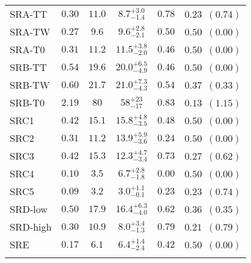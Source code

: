{\begin{tabular*}{\textwidth}{@{\extracolsep{\fill}}lccccc}
SRA-TT    & $0.30$ &  $11.0$ & $ { 8.7 }^{ +3.0 }_{ -1.4 }$ & $0.78$ & $ 0.23$~$(0.74)$ \\%
SRA-TW    & $0.27$ &  $9.6$ & $ { 9.6 }^{ +2.8 }_{ -2.1 }$ & $0.50$ & $ 0.50$~$(0.00)$ \\%
SRA-T0    & $0.31$ &  $11.2$ & $ { 11.5 }^{ +3.8 }_{ -2.0 }$ & $0.46$ & $ 0.50$~$(0.00)$ \\%
SRB-TT    & $0.54$ &  $19.6$ & $ { 20.0 }^{ +6.5 }_{ -4.9 }$ & $0.46$ & $ 0.50$~$(0.00)$ \\%
SRB-TW    & $0.60$ &  $21.7$ & $ { 21.0 }^{ +7.3 }_{ -4.3 }$ & $0.54$ & $ 0.37$~$(0.33)$ \\%
SRB-T0    & $2.19$ &  $80$ & $ { 58 }^{ +23 }_{ -17 }$ & $0.83$ & $ 0.13$~$(1.15)$ \\%
SRC1    & $0.42$ &  $15.1$ & $ { 15.8 }^{ +4.8 }_{ -3.5 }$ & $0.48$ & $ 0.50$~$(0.00)$ \\%
SRC2    & $0.31$ &  $11.2$ & $ { 13.9 }^{ +5.9 }_{ -3.6 }$ & $0.24$ & $ 0.50$~$(0.00)$ \\%
SRC3    & $0.42$ &  $15.3$ & $ { 12.3 }^{ +4.7 }_{ -3.4 }$ & $0.73$ & $ 0.27$~$(0.62)$ \\%
SRC4    & $0.10$ &  $3.5$ & $ { 6.7 }^{ +2.8 }_{ -1.8 }$ & $0.00$ & $ 0.50$~$(0.00)$ \\%
SRC5    & $0.09$ &  $3.2$ & $ { 3.0 }^{ +1.1 }_{ -0.1 }$ & $0.23$ & $ 0.23$~$(0.74)$ \\%
SRD-low    & $0.50$ &  $17.9$ & $ { 16.4 }^{ +6.3 }_{ -4.0 }$ & $0.62$ & $ 0.36$~$(0.35)$ \\%
SRD-high    & $0.30$ &  $10.9$ & $ { 8.0 }^{ +3.4 }_{ -1.3 }$ & $0.79$ & $ 0.21$~$(0.79)$ \\%
SRE    & $0.17$ &  $6.1$ & $ { 6.4 }^{ +1.4 }_{ -2.4 }$ & $0.42$ & $ 0.50$~$(0.00)$ \\%

\noalign{\smallskip}\hline\noalign{\smallskip}
\end{tabular*}
}
%
